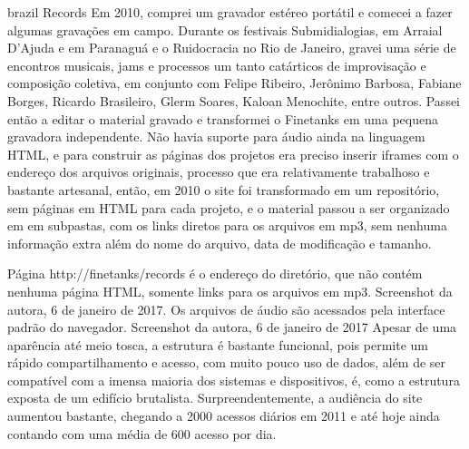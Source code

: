 \begin{otherlanguage*}{brazil}
Records
Em 2010, comprei um gravador estéreo portátil e comecei a fazer algumas gravações em campo. Durante os festivais Submidialogias, em Arraial D'Ajuda e em Paranaguá e o Ruidocracia no Rio de Janeiro, gravei uma série de encontros musicais, jams e processos um tanto catárticos de improvisação e composição coletiva, em conjunto com Felipe Ribeiro, Jerônimo Barbosa, Fabiane Borges, Ricardo Brasileiro, Glerm Soares, Kaloan Menochite, entre outros. Passei então a editar o material gravado e transformei o Finetanks em uma pequena gravadora independente. Não havia suporte para áudio ainda na linguagem HTML, e para construir as páginas dos projetos era preciso inserir iframes com o endereço dos arquivos originais, processo que era relativamente trabalhoso e bastante artesanal, então, em 2010 o site foi transformado em um repositório, sem páginas em HTML para cada projeto, e o material passou a ser organizado em em subpastas, com os links diretos para os arquivos em mp3, sem nenhuma informação extra além do nome do arquivo, data de modificação e tamanho. 

Página http://finetanks/records é o endereço do diretório, que não contém nenhuma página HTML, somente links para os arquivos em mp3. Screenshot da autora, 6 de janeiro de 2017.
Os arquivos de áudio são acessados pela interface padrão do navegador. Screenshot da autora, 6 de janeiro de 2017
Apesar de uma aparência até meio tosca, a estrutura é bastante funcional, pois permite um rápido compartilhamento e acesso, com muito pouco uso de dados, além de ser compatível com a imensa maioria dos sistemas e dispositivos, é, como a estrutura exposta de um edifício brutalista. Surpreendentemente, a audiência do site aumentou bastante, chegando a 2000 acessos diários em 2011 e até hoje ainda contando com uma média de 600 acesso por dia.


\end{otherlanguage*}
